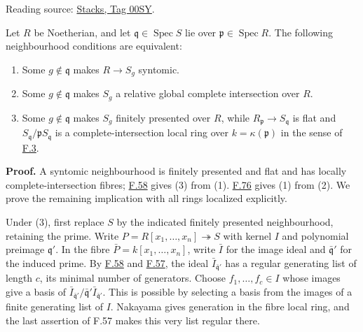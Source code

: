 \documentclass[11pt,a4paper,openany]{report}
\providecommand{\tightlist}{\setlength{\itemsep}{0pt}\setlength{\parskip}{0pt}}
\begin{document}
Reading source: \href{https://stacks.math.columbia.edu/tag/00SY}{Stacks, Tag 00SY}.

Let \(R\) be Noetherian, and let \(\mathfrak q\in\operatorname{Spec}S\) lie over \(\mathfrak p\in\operatorname{Spec}R\). The following neighbourhood conditions are equivalent:

\begin{enumerate}
\def\labelenumi{\arabic{enumi}.}
\tightlist
\item
  Some \(g\notin\mathfrak q\) makes \(R\to S_g\) syntomic.
\item
  Some \(g\notin\mathfrak q\) makes \(S_g\) a relative global complete intersection over \(R\).
\item
  Some \(g\notin\mathfrak q\) makes \(S_g\) finitely presented over \(R\), while \(R_{\mathfrak p}\to S_{\mathfrak q}\) is flat and \(S_{\mathfrak q}/\mathfrak pS_{\mathfrak q}\) is a complete-intersection local ring over \(k=\kappa(\mathfrak p)\) in the sense of \hyperref[AG-RG-S05-algebra-definition-lci-local-ring]{F.3}.
\end{enumerate}

\textbf{Proof.} A syntomic neighbourhood is finitely presented and flat and has locally complete-intersection fibres; \hyperref[AG-RG-S05-algebra-lemma-lci-at-prime]{F.58} gives (3) from (1). \hyperref[AG-RG-S05-algebra-lemma-relative-global-complete-intersection]{F.76} gives (1) from (2). We prove the remaining implication with all rings localized explicitly.

Under (3), first replace \(S\) by the indicated finitely presented neighbourhood, retaining the prime. Write \(P=R[x_1,\ldots,x_n]\twoheadrightarrow S\) with kernel \(I\) and polynomial preimage \(\mathfrak q'\). In the fibre \(\bar P=k[x_1,\ldots,x_n]\), write \(\bar I\) for the image ideal and \(\bar{\mathfrak q}'\) for the induced prime. By \hyperref[AG-RG-S05-algebra-lemma-lci-at-prime]{F.58} and \hyperref[AG-RG-S05-algebra-lemma-lci]{F.57}, the ideal \(\bar I_{\bar{\mathfrak q}'}\) has a regular generating list of length \(c\), its minimal number of generators. Choose \(f_1,\ldots,f_c\in I\) whose images give a basis of \(\bar I_{\bar{\mathfrak q}'}/\bar{\mathfrak q}'\bar I_{\bar{\mathfrak q}'}\). This is possible by selecting a basis from the images of a finite generating list of \(I\). Nakayama gives generation in the fibre local ring, and the last assertion of F.57 makes this very list regular there.
\end{document}

